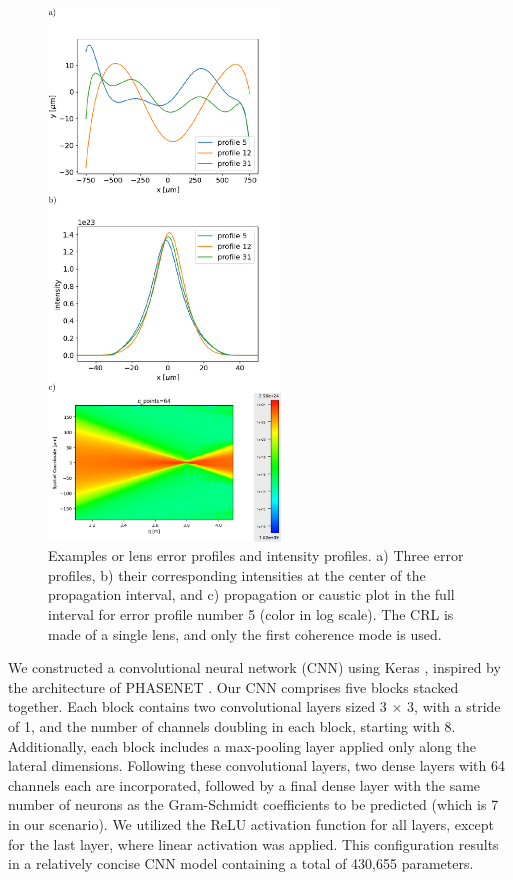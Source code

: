 \documentclass[preprint]{iucr}
\newcommand{\inred}[1]{{\color{red}#1}}
\begin{document}
\begin{figure}\label{fig:sample}
\includegraphics[width=0.55\textwidth]{figures/figure2.pdf}
    
    \caption{Examples or lens error profiles and intensity profiles. a) Three error profiles, b) their corresponding intensities at the center of the propagation interval, and c) propagation or caustic plot in the full interval for error profile number 5 (color in log scale). The CRL is made of a single lens, and only the first coherence mode is used.
    }
\end{figure}

\inred{
We constructed a convolutional neural network (CNN) using Keras \cite{keras}, inspired by the architecture of PHASENET \cite{Saha2020}. Our CNN comprises five blocks stacked together. Each block contains two convolutional layers sized 3 $\times$ 3, with a stride of 1, and the number of channels doubling in each block, starting with 8. Additionally, each block includes a max-pooling layer applied only along the lateral dimensions. Following these convolutional layers, two dense layers with 64 channels each are incorporated, followed by a final dense layer with the same number of neurons as the Gram-Schmidt coefficients to be predicted (which is 7 in our scenario). We utilized the ReLU activation function for all layers, except for the last layer, where linear activation was applied. This configuration results in a relatively concise CNN model containing a total of 430,655 parameters.
}
\end{document}
